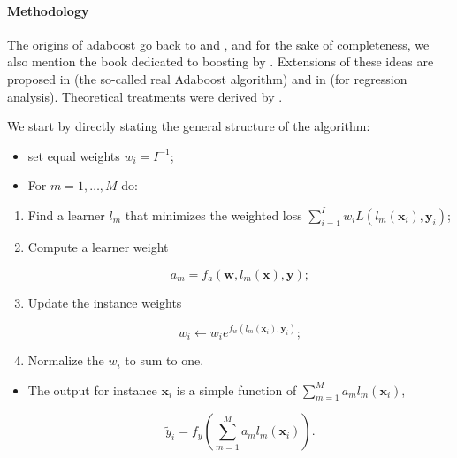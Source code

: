 \paragraph{Methodology}

The origins of adaboost go back to \cite{freund1997decision} and \cite{freund1996experiments}, and for the sake of completeness, we also mention the book dedicated to boosting by \cite{schapire2012boosting}. Extensions of these ideas are proposed in \cite{friedman2000additive} (the so-called real Adaboost algorithm) and in \cite{drucker1997improving} (for regression analysis). Theoretical treatments were derived by \cite{breiman2004population}.

We start by directly stating the general structure of the algorithm:

\begin{itemize}
\item set equal weights $w_i=I^{ -1}$;
\item For $m=1,\dots,M$ do:
\end{itemize}

\begin{enumerate}
\item Find a learner $l_m$ that minimizes the weighted loss $\sum_{i=1}^Iw_iL(l_m(\textbf{x}_i),\textbf{y}_i)$;
\item Compute a learner weight

\begin{equation}
a_m=f_a(\textbf{w},l_m(\textbf{x}),\textbf{y});
\end{equation}


\item Update the instance weights

\begin{equation}
w_i \leftarrow w_ie^{f_w(l_m(\textbf{x}_i), \textbf{y}_i)};
\end{equation}


\item Normalize the $w_i$ to sum to one.
\end{enumerate}

\begin{itemize}
\item The output for instance $\textbf{x}_i$ is a simple function of $\sum_{m=1}^M a_ml_m(\textbf{x}_i)$,

\begin{equation}
\tilde{y}_i=f_y\left(\sum_{m=1}^M a_ml_m(\textbf{x}_i) \right).
\end{equation}
\end{itemize}

